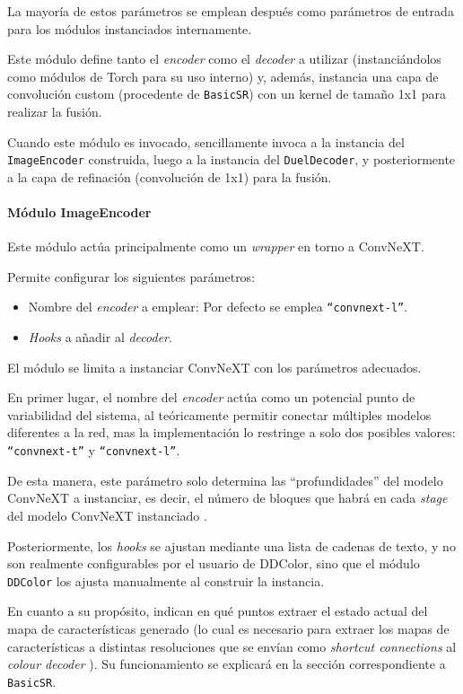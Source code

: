 \documentclass[a4paper]{article}
\begin{document}
La mayoría de estos parámetros se emplean después como parámetros de entrada para los módulos instanciados internamente.

Este módulo define tanto el \textit{encoder} como el \textit{decoder} a utilizar (instanciándolos como módulos de Torch para su uso interno) y, además, instancia una capa de convolución custom (procedente de \texttt{BasicSR}) con un kernel de tamaño 1x1 para realizar la fusión.

Cuando este módulo es invocado, sencillamente invoca a la instancia del \texttt{ImageEncoder} construida, luego a la instancia del \texttt{DuelDecoder}, y posteriormente a la capa de refinación (convolución de 1x1) para la fusión.

\paragraph{Módulo ImageEncoder}

Este módulo actúa principalmente como un \textit{wrapper} en torno a ConvNeXT.

Permite configurar los siguientes parámetros:

\begin{itemize}
  \item{Nombre del \textit{encoder} a emplear: Por defecto se emplea \texttt{``convnext-l''}.}
  \item{\textit{Hooks} a añadir al \textit{decoder}.}
\end{itemize}

El módulo se limita a instanciar ConvNeXT con los parámetros adecuados.

En primer lugar, el nombre del \textit{encoder} actúa como un potencial punto de variabilidad del sistema, al teóricamente permitir conectar múltiples modelos diferentes a la red, mas la implementación lo restringe a solo dos posibles valores: \texttt{``convnext-t''} y \texttt{``convnext-l''}.

De esta manera, este parámetro solo determina las ``profundidades'' del modelo ConvNeXT a instanciar, es decir, el número de bloques que habrá en cada \textit{stage} del modelo ConvNeXT instanciado \cite{ConvNeXT}.

Posteriormente, los \textit{hooks} se ajustan mediante una lista de cadenas de texto, y no son realmente configurables por el usuario de DDColor, sino que el módulo \texttt{DDColor} los ajusta manualmente al construir la instancia.

En cuanto a su propósito, indican en qué puntos extraer el estado actual del mapa de características generado (lo cual es necesario para extraer los mapas de características a distintas resoluciones que se envían como \textit{shortcut connections} al \textit{colour decoder} \cite{DDColor}). Su funcionamiento se explicará en la sección correspondiente a \texttt{BasicSR}.
\end{document}
